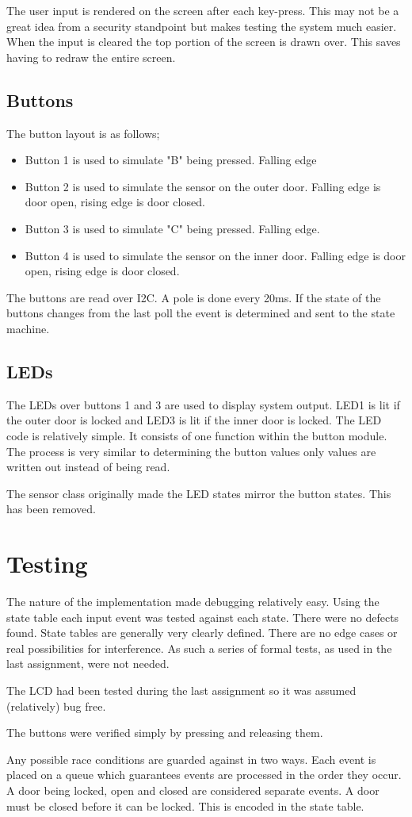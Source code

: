 \documentclass{article}
\begin{document}
The user input is rendered on the screen after each key-press. This may not be a great idea from a security standpoint but makes testing the system much easier. When the input is cleared the top portion of the screen is drawn over. This saves having to redraw the entire screen.


\subsection{Buttons}
The button layout is as follows;
\begin{itemize}
\item Button 1 is used to simulate "B" being pressed. Falling edge
\item Button 2 is used to simulate the sensor on the outer door. Falling edge is door open, rising edge is door closed.
\item Button 3 is used to simulate "C" being pressed. Falling edge.
\item Button 4 is used to simulate the sensor on the inner door. Falling edge is door open, rising edge is door closed.
\end{itemize}

The buttons are read over I2C. A pole is done every 20ms. If the state of the buttons changes from the last poll the event is determined and sent to the state machine.

\subsection{LEDs}
The LEDs over buttons 1 and 3 are used to display system output. LED1 is lit if the outer door is locked and LED3 is lit if the inner door is locked. The LED code is relatively simple. It consists of one function within the button module. The process is very similar to determining the button values only values are written out instead of being read.

The sensor class originally made the LED states mirror the button states. This has been removed.

\section{Testing}
The nature of the implementation made debugging relatively easy. Using the state table each input event was tested against each state. There were no defects found. State tables are generally very clearly defined. There are no edge cases or real possibilities for interference. As such a series of formal tests, as used in the last assignment, were not needed. 

The LCD had been tested during the last assignment so it was assumed (relatively) bug free.

The buttons were verified simply by pressing and releasing them.

Any possible race conditions are guarded against in two ways. Each event is placed on a queue which guarantees events are processed in the order they occur. A door being locked, open and closed are considered separate events. A door must be closed before it can be locked. This is encoded in the state table.  
\end{document}
